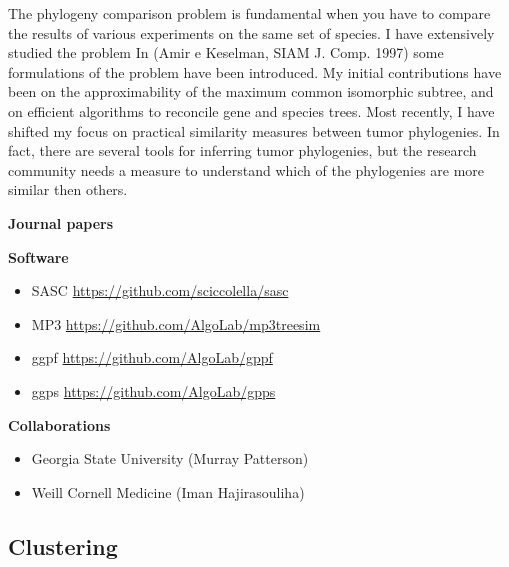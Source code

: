 \documentclass[11pt,a4paper,roman]{moderncv}
\begin{document}
The phylogeny comparison problem is fundamental when you have to compare
the results of various experiments on the same set of species. I have
extensively studied the problem In (Amir e Keselman, SIAM J. Comp. 1997)
some formulations of the problem have been introduced. My initial contributions
have been on the approximability of the maximum common isomorphic
subtree, and on efficient algorithms to reconcile gene and species trees.
Most recently, I have shifted my focus on practical similarity measures between
tumor phylogenies.
In fact, there are several tools for inferring tumor phylogenies, but the
research community needs a measure to understand which of the phylogenies are
more similar then others.


\textbf{Journal papers}

\cite{DBLP:journals/jcb/AliCLVP21}
\cite{DBLP:journals/bioinformatics/CiccolellaRGPSB21}
\cite{DBLP:journals/bioinformatics/CiccolellaBDBPV21}
\cite{DBLP:journals/bmcbi/CiccolellaGPVHB20}
\cite{DBLP:journals/tcbb/BonizzoniCVS19}
\cite{DBLP:journals/tcs/BonizzoniCVRT17}
\cite{DBLP:journals/fuin/BonizzoniCVRT17}
\cite{bonizzoniExplainingEvolutionConstrained2014}
\cite{DBLP:journals/tcs/BonizzoniVD05}
\cite{DBLP:journals/bioinformatics/VedovaW02}
\cite{DBLP:journals/ijfcs/BonizzoniVM00}


\textbf{Software}

\begin{itemize}
	\item
	      SASC \url{https://github.com/sciccolella/sasc}
	\item
	      MP3 \url{https://github.com/AlgoLab/mp3treesim}
	\item
	      ggpf \url{https://github.com/AlgoLab/gppf}
	\item
	      ggps \url{https://github.com/AlgoLab/gpps}
\end{itemize}

\textbf{Collaborations}

\begin{itemize}
	\item
	      Georgia State University (Murray Patterson)
	\item
	      Weill Cornell Medicine (Iman Hajirasouliha)
\end{itemize}

\subsection{Clustering}\label{clustering}
\end{document}
